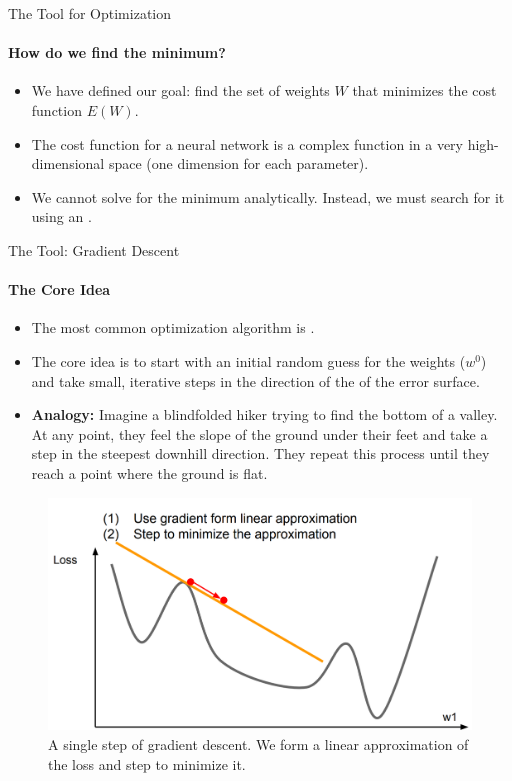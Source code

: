 \begin{frame}{The Tool for Optimization}
    \framesubtitle{How do we find the minimum?}
    \begin{itemize}
        \item We have defined our goal: find the set of weights $W$ that minimizes the cost function $E(W)$.
        \item The cost function for a neural network is a complex function in a very high-dimensional space (one dimension for each parameter).
        \item We cannot solve for the minimum analytically. Instead, we must search for it using an .
    \end{itemize}
\end{frame}

\begin{frame}{The Tool: Gradient Descent}
    \framesubtitle{The Core Idea}
    \small
    \begin{itemize}
        \item The most common optimization algorithm is .
        \item The core idea is to start with an initial random guess for the weights ($w^0$) and take small, iterative steps in the direction of the  of the error surface.
        \item \textbf{Analogy:} Imagine a blindfolded hiker trying to find the bottom of a valley. At any point, they feel the slope of the ground under their feet and take a step in the steepest downhill direction. They repeat this process until they reach a point where the ground is flat.
    \end{itemize}
    \begin{figure}
        \centering
        \includegraphics[width=0.4\linewidth]{images/gradient_descent_step.png}
        \caption{A single step of gradient descent. We form a linear approximation of the loss and step to minimize it.}
    \end{figure}
\end{frame}

